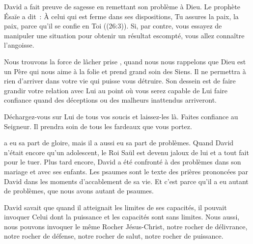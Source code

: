 
David a fait preuve de sagesse en remettant son problème à Dieu.
 Le prophète Ésaïe a dit~:
 \og \`A celui qui est ferme dans ses dispositions, Tu assures la paix,
 la paix, parce qu'il se confie en Toi \fg{} ((26:3)).
 Si, par contre, vous essayez de manipuler une situation pour obtenir
 un résultat escompté, vous allez connaître l'angoisse. 

Nous trouvons la force de \og lâcher prise \fg{},
 quand nous nous rappelons que Dieu est un Père qui nous aime
 à la folie et prend grand soin des Siens.
 Il ne permettra à rien d'arriver dans votre vie qui puisse vous détruire.
 Son dessein est de faire grandir votre relation avec Lui au point
 où vous serez capable de Lui faire confiance quand des déceptions
 ou des malheurs inattendus arriveront. 

Déchargez-vous sur Lui de tous vos soucis et laissez-les là.
 Faites confiance au Seigneur.
 Il prendra soin de tous les fardeaux que vous portez. 

\dvrule






 a eu sa part de gloire,
 mais il a aussi eu sa part de problèmes.
 Quand David n'était encore qu'un adolescent,
 le Roi Saül est devenu jaloux de lui et a tout fait pour le tuer.
 Plus tard encore, David a été confronté à des problèmes dans son mariage
 et avec ses enfants. Les psaumes sont le texte des prières prononcées
 par David dans les moments d'accablement de sa vie.
 Et c'est parce qu'il a eu autant de problèmes,
 que nous avons autant de psaumes.


David savait que quand il atteignait les limites de ses capacités,
 il pouvait invoquer Celui dont la puissance et les capacités sont sans limites.
 Nous aussi, nous pouvons invoquer le même Rocher \ocadr Jésus-Christ,
 notre rocher de délivrance, notre rocher de défense, notre rocher de salut,
 notre rocher de puissance.

